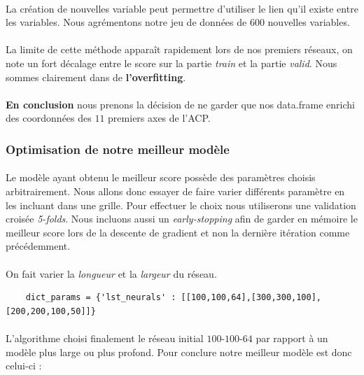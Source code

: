 \documentclass[14pt, openany]{article}
\begin{document}
\paragraph{}
La création de nouvelles variable peut permettre d'utiliser le lien qu'il existe entre les variables. Nous agrémentons notre jeu de données de $600$ nouvelles variables.

\paragraph{}
La limite de cette méthode apparaît rapidement lors de nos premiers réseaux, on note un fort décalage entre le score sur la partie \textit{train} et la partie \textit{valid}. Nous sommes clairement dans de \textbf{l'overfitting}.


\paragraph{}
\textbf{En conclusion} nous prenons la décision de ne garder que nos data.frame enrichi des coordonnées des $11$ premiers axes de l'ACP.

\subsubsection{Optimisation de notre meilleur modèle}
\paragraph{}
Le modèle ayant obtenu le meilleur score possède des paramètres choisis arbitrairement. Nous allons donc essayer de faire varier différents paramètre en les incluant dans une grille. Pour effectuer le choix nous utiliserons une validation croisée \textit{5-folds}. Nous incluons aussi un \textit{early-stopping} afin de garder en mémoire le meilleur score lors de la descente de gradient et non la dernière itération comme précédemment.

\paragraph{}
On fait varier la \textit{longueur} et la \textit{largeur} du réseau.
\begin{verbatim}
    dict_params = {'lst_neurals' : [[100,100,64],[300,300,100],[200,200,100,50]]}
\end{verbatim}

\paragraph{}
L'algorithme choisi finalement le réseau initial $100$-$100$-$64$ par rapport à un modèle plus large ou plus profond. Pour conclure notre meilleur modèle est donc celui-ci :
\end{document}
